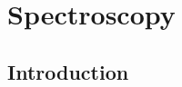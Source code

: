 \chapter{Spectroscopy} \label{cha:spec}

\clearpage

\section{Introduction}  %

\clearpage

\clearpage
